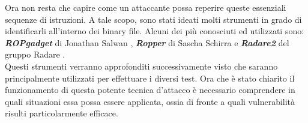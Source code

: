 Ora non resta che capire come un attaccante possa reperire queste essenziali sequenze di istruzioni. A tale scopo, sono stati ideati molti strumenti in grado di identificarli all'interno dei binary file.
Alcuni dei più conosciuti ed utilizzati sono: \textbf{\textit{ROPgadget}} di Jonathan Salwan \cite*{ROPgadget}, \textbf{\textit{Ropper}} di Sascha Schirra \cite*{Ropper} e \textbf{\textit{Radare2}} del gruppo Radare \cite*{Radare2}.\\
Questi strumenti verranno approfonditi successivamente visto che saranno principalmente utilizzati per effettuare i diversi test.
Ora che è stato chiarito il funzionamento di questa potente tecnica d'attacco è necessario comprendere in quali situazioni essa possa essere applicata, ossia di fronte a quali vulnerabilità risulti 
particolarmente efficace.


